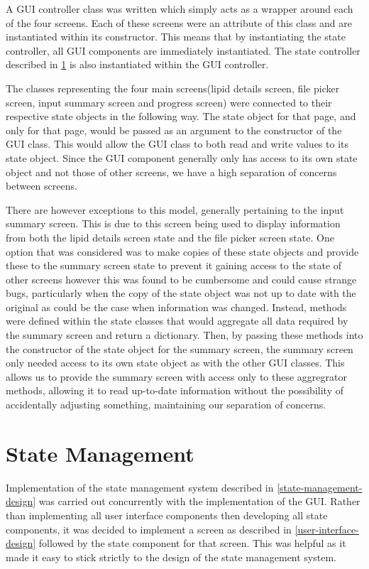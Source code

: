 \documentclass{l4proj}
\begin{document}
A GUI controller class was written which simply acts as a wrapper around each of the four screens. Each of these screens were an attribute of this class and are instantiated within its constructor. This means that by instantiating the state controller, all GUI components are immediately instantiated. The state controller described in \ref{state-management-implementation} is also instantiated within the GUI controller.

The classes representing the four main screens(lipid details screen, file picker screen, input summary screen and progress screen) were connected to their respective state objects in the following way. The state object for that page, and only for that page, would be passed as an argument to the constructor of the GUI class. This would allow the GUI class to both read and write values to its state object. Since the GUI component generally only has access to its own state object and not those of other screens, we have a high separation of concerns between screens.

There are however exceptions to this model, generally pertaining to the input summary screen. This is due to this screen being used to display information from both the lipid details screen state and the file picker screen state. One option that was considered was to make copies of these state objects and provide these to the summary screen state to prevent it gaining access to the state of other screens however this was found to be cumbersome and could cause strange bugs, particularly when the copy of the state object was not up to date with the original as could be the case when information was changed. Instead, methods were defined within the state classes that would aggregate all data required by the summary screen and return a dictionary. Then, by passing these methods into the constructor of the state object for the summary screen, the summary screen only needed access to its own state object as with the other GUI classes. This allows us to provide the summary screen with access only to these aggregrator methods, allowing it to read up-to-date information without the possibility of accidentally adjusting something, maintaining our separation of concerns.

\section{State Management} \label{state-management-implementation}
Implementation of the state management system described in \ref{state-management-design} was carried out concurrently with the implementation of the GUI. Rather than implementing all user interface components then developing all state components, it was decided to implement a screen as described in \ref{user-interface-design} followed by the state component for that screen. This was helpful as it made it easy to stick strictly to the design of the state management system.
\end{document}
